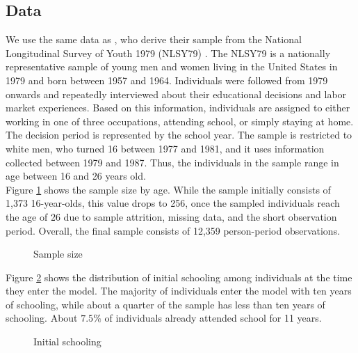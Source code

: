 \subsection{Data}\label{Appendix data}\FloatBarrier
We use the same data as , who derive their sample from the National Longitudinal Survey of Youth 1979 (NLSY79) . The NLSY79 is a nationally representative sample of young men and women living in the United States in 1979 and born between 1957 and 1964. Individuals were followed from 1979 onwards and repeatedly interviewed about their educational decisions and labor market experiences. Based on this information, individuals are assigned to either working in one of three occupations, attending school, or simply staying at home. The decision period is represented by the school year. The sample is restricted to white men, who turned 16 between 1977 and 1981, and it uses information collected between 1979 and 1987. Thus, the individuals in the sample range in age between 16 and 26 years old.\\

\noindent Figure \ref{Sample size} shows the sample size by age. While the sample initially consists of 1,373 16-year-olds, this value drops to 256, once the sampled individuals reach the age of 26 due to sample attrition, missing data, and the short observation period. Overall, the final sample consists of 12,359 person-period observations.\\

\begin{figure}[ht!]\centering
{}
\caption{Sample size}\label{Sample size}
\end{figure}\FloatBarrier

\noindent Figure \ref{Initial schooling} shows the distribution of initial schooling among individuals at the time they enter the model. The majority of individuals enter the model with ten years of schooling, while about a quarter of the sample has less than ten years of schooling. About $7.5\%$ of individuals already attended school for 11 years.\\

\begin{figure}[ht!]\centering
{}
\caption{Initial schooling}\label{Initial schooling}
\end{figure}\FloatBarrier

